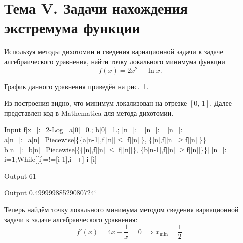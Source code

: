 \documentclass[a4paper]{article}
\begin{document}
\section*{Тема V. Задачи нахождения экстремума функции}
\begin{hiProb}[7.1а]
Используя методы дихотомии и сведения вариационной задачи к
задаче алгебраического уравнения, найти точку локального минимума
функции
\[
	f(x)= 2x^2 -\ln x
.\] 
\end{hiProb}
\begin{sol}
График данного уравнения приведён на рис.~\ref{fig:5}.
\begin{figure}[htpb]
	\centering
	\caption{}
	\label{fig:5}
\end{figure}
Из построения видно, что минимум локализован на отрезке $[0,\,1]$.
Далее представлен код в Mathematica для метода дихотомии.
\begin{mmaCell}[moredefined={u,x,min,f, a, b, i},morepattern={x_, n_, n}]{Input}
  f[x_]:=2-Log[]
  a[0]=0.;
  b[0]=1.;
  \mmaDef{\(\pmb{\Delta}\)}[n_]:=
  [n_]:=
  [n_]:=
  a[n_]:=a[n]=Piecewise[\{\{a[n-1],f[[n]]\(\pmb{\leq}\) f[[n]]\},
  \{[n],f[[n]]\(\pmb{\geq}\)f[[n]]\}\}]
  b[n_]:=b[n]=Piecewise[\{\{[n],f[[n]]\(\pmb{\leq}\) f[[n]]\},
  \{b[n-1],f[[n]]\(\pmb{\geq}\)f[[n]]\}\}]
  [n_]:=
  i=1;While[[i]=!=[i-1],i++] 
  i
  [i]
\end{mmaCell}
\begin{mmaCell}[]{Output}
  61
\end{mmaCell}
\begin{mmaCell}{Output}
  0.49999988529080724`
\end{mmaCell}
Теперь найдём точку локального минимума методом сведения
вариационной задачи к задаче алгебраического уравнения:
\[
	f'(x)=4x-\frac{1}{x}=0 \implies x_{\text{min}}= \frac{1}{2}
.\] 
\end{sol}
\end{document}
